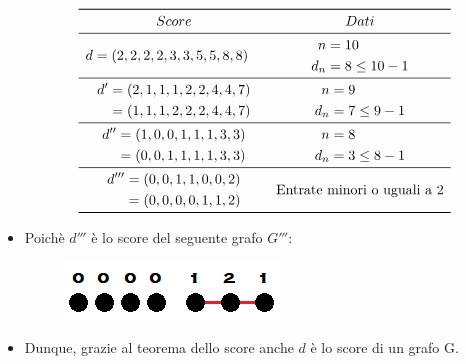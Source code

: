 \documentclass[10pt]{article}
\begin{document}
\begin{itemize}
	\[
	\begin{array}{cc}
		\toprule
		Score & Dati \\
		\midrule
		\begin{split} d &= (2,2,2,2,3,3,5,5,8,8) \end{split} & \begin{split} n &= 10 \\ d_n &= 8 \leq 10 -1 \end{split} \\
		\midrule
		\begin{split} d' &= (2,1,1,1,2,2,4,4,7) \\ &= (1,1,1,2,2,2,4,4,7) \end{split} & \begin{split} n &= 9 \\ d_n &= 7 \leq 9 -1 \end{split} \\
		\midrule
		\begin{split} d'' &= (1,0,0,1,1,1,3,3) \\ &= (0,0,1,1,1,1,3,3) \end{split} & \begin{split} n &= 8 \\ d_n &= 3 \leq 8 -1 \end{split} \\
		\midrule
		\begin{split} d''' &= (0,0,1,1,0,0,2) \\ &= (0,0,0,0,1,1,2)  \end{split} & \textrm{Entrate minori o uguali a 2} \\
		\bottomrule
	\end{array}
	\]
	\item
	Poichè $d'''$ è lo score del seguente grafo $G'''$:
	\begin{center}
		\begin{figure}[h]
		\centering
		\includegraphics[width = 0.2\linewidth]{scoreGrafo_Esercizio2}
	\end{figure}
	\end{center}
	\item
	Dunque, grazie al teorema dello score anche $d$ è lo score di un grafo G.
	\end{itemize}
	
\end{document}
